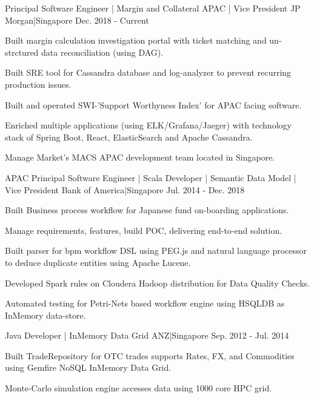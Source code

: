 \begin{cventries}
    {Principal Software Engineer | Margin and Collateral APAC | Vice President }
    {JP Morgan|Singapore}
    {Dec. 2018 - Current}
    {
      \begin{cvitems}
        \item {Built margin calculation investigation portal with ticket matching and un-strctured data reconciliation (using DAG).}
        \item {Built SRE tool for Cassandra database and log-analyzer to prevent recurring production issues.}
        \item {Built and operated SWI-'Support Worthyness Index' for APAC facing software.}
        \item {Enriched multiple applications (using ELK/Grafana/Jaeger) with technology stack of Spring Boot, React, ElasticSearch and Apache Cassandra.}
        \item {Manage Market's MACS APAC development team located in Singapore.}
      \end{cvitems}
    }
    {APAC Principal Software Engineer | Scala Developer | Semantic Data Model | Vice President}
    {Bank of America|Singapore}
    {Jul. 2014 - Dec. 2018}
    {
      \begin{cvitems}
        \item {Built Business process workflow for Japanese fund on-boarding applications.}
        \item {Manage requirements, features, build POC, delivering end-to-end solution.}
        \item {Built parser for bpm workflow DSL using PEG.js and natural language processor to deduce duplicate entities using Apache Lucene.}
        \item {Developed Spark rules on Cloudera Hadoop distribution for Data Quality Checks.}
        \item {Automated testing for Petri-Nets based workflow engine using HSQLDB as InMemory data-store.}
      \end{cvitems}
    }
    {Java Developer | InMemory Data Grid}
    {ANZ|Singapore}
    {Sep. 2012 - Jul. 2014}
    {
      \begin{cvitems}
        \item {Built TradeRepository for OTC trades  supports Rates, FX, and Commodities using Gemfire NoSQL InMemory Data Grid.}
        \item {Monte-Carlo simulation engine accesses data using 1000 core HPC grid.}

\end{cvitems}}
\end{cventries}
